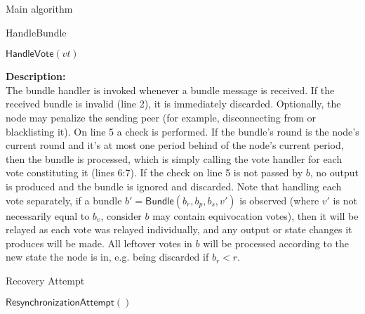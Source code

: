 \documentclass[10pt,a4paper]{article}
\begin{document}
\begin{section}{Main algorithm}
\begin{subsection}{HandleBundle}
\begin{algorithm}[H]
\begin{algorithmic}[1]
                    \State $\mathsf{HandleVote}(vt)$
                \EndFor
            \EndIf


        \EndFunction
        \end{algorithmic}
    \end{algorithm}
    
    
    \noindent \textbf{Description:}\\
The bundle handler is invoked whenever a bundle message is received. 
If the received bundle is invalid (line 2), it is immediately discarded. Optionally, the node may
penalize the sending peer (for example, disconnecting from or blacklisting it).
On line 5 a check is performed. 
If the bundle's round is the node's current round and it's at most one period behind of the node's current period, 
then the bundle is processed, which is simply calling the vote handler for each 
vote constituting it (lines 6:7). If the check on line 5 is not passed by $b$, no output is produced
and the bundle is ignored and discarded.
Note that handling each vote separately, if a bundle $b\prime = \mathsf{Bundle}(b_r, b_p, b_s, v\prime)$ is observed
(where $v\prime$ is not necessarily equal to $b_v$, consider $b$ may contain equivocation votes), then it will be relayed
as each vote was relayed individually, and any output or state changes it produces will be made. All leftover votes 
in $b$ will be processed according to the new state the node is in, e.g. being discarded if $b_r < r$.
    
\end{subsection}


\begin{subsection}{Recovery Attempt}
    \label{ssect:Recovery}

    \begin{algorithm}[H]
        \caption{\underline{Recovery}}
        \label{algo:recovery}
        \begin{algorithmic}[1]

        \State $\mathsf{ResynchronizationAttempt}()$
    

\end{algorithmic}
\end{algorithm}
\end{subsection}
\end{section}
\end{document}
